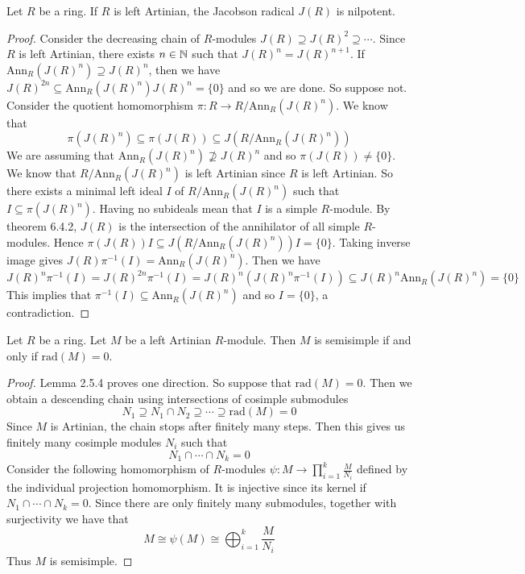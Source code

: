 \documentclass[a4paper]{article}
\begin{document}
\begin{prp}{}{} Let $R$ be a ring. If $R$ is left Artinian, the Jacobson radical $J(R)$ is nilpotent. 
\begin{proof}
Consider the decreasing chain of $R$-modules $J(R)\supseteq J(R)^2\supseteq\cdots$. Since $R$ is left Artinian, there exists $n\in\mathbb{N}$ such that $J(R)^n=J(R)^{n+1}$. If $\text{Ann}_R(J(R)^n)\supseteq J(R)^n$, then we have $J(R)^{2n}\subseteq\text{Ann}_R(J(R)^n)J(R)^n=\{0\}$ and so we are done. So suppose not. Consider the quotient homomorphism $\pi:R\to R/\text{Ann}_R(J(R)^n)$. We know that $$\pi(J(R)^n)\subseteq\pi(J(R))\subseteq J(R/\text{Ann}_R(J(R)^n))$$ We are assuming that $\text{Ann}_R(J(R)^n)\not\supseteq J(R)^n$ and so $\pi(J(R))\neq\{0\}$. We know that $R/\text{Ann}_R(J(R)^n)$ is left Artinian since $R$ is left Artinian. So there exists a minimal left ideal $I$ of $R/\text{Ann}_R(J(R)^n)$ such that $I\subseteq\pi(J(R)^n)$. Having no subideals mean that $I$ is a simple $R$-module. By theorem 6.4.2, $J(R)$ is the intersection of the annihilator of all simple $R$-modules. Hence $\pi(J(R))I\subseteq J(R/\text{Ann}_R(J(R)^n))I=\{0\}$. Taking inverse image gives $J(R)\pi^{-1}(I)=\text{Ann}_R(J(R)^n)$. Then we have $$J(R)^n\pi^{-1}(I)=J(R)^{2n}\pi^{-1}(I)=J(R)^n(J(R)^n\pi^{-1}(I))\subseteq J(R)^n\text{Ann}_R(J(R)^n)=\{0\}$$ This implies that $\pi^{-1}(I)\subseteq\text{Ann}_R(J(R)^n)$ and so $I=\{0\}$, a contradiction. 
\end{proof}
\end{prp}

\begin{prp}{}{} Let $R$ be a ring. Let $M$ be a left Artinian $R$-module. Then $M$ is semisimple if and only if $\text{rad}(M)=0$. 
\begin{proof}
Lemma 2.5.4 proves one direction. So suppose that $\text{rad}(M)=0$. Then we obtain a descending chain using intersections of cosimple submodules $$N_1\supseteq N_1\cap N_2\supseteq\cdots\supseteq\text{rad}(M)=0$$ Since $M$ is Artinian, the chain stops after finitely many steps. Then this gives us finitely many cosimple modules $N_i$ such that $$N_1\cap\cdots\cap N_k=0$$ Consider the following homomorphism of $R$-modules $\psi:M\to\prod_{i=1}^k\frac{M}{N_i}$ defined by the individual projection homomorphism. It is injective since its kernel if $N_1\cap\cdots\cap N_k=0$. Since there are only finitely many submodules, together with surjectivity we have that $$M\cong\psi(M)\cong\bigoplus_{i=1}^k\frac{M}{N_i}$$ Thus $M$ is semisimple. 
\end{proof}
\end{prp}
\end{document}
